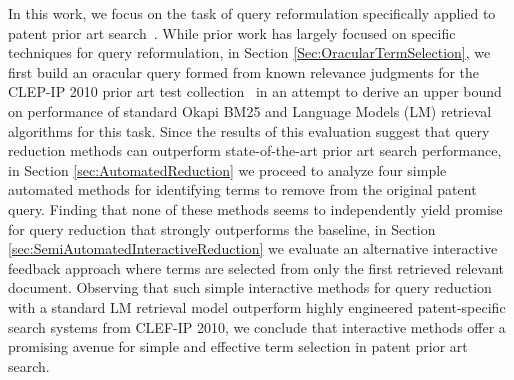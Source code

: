 %
%
In this work, we focus on the task of query
reformulation
specifically applied to patent
prior art
search~\cite{mahdabi2014patent,xue2009transforming}.  While
prior work has largely focused on specific techniques for query
reformulation, in Section \ref{Sec:OracularTermSelection}, we first
build an oracular query formed from known relevance judgments for the
CLEP-IP 2010 prior art test collection~\cite{piroi2010clef} in an attempt
to derive an upper bound on performance of standard Okapi BM25 and
Language Models (LM) retrieval algorithms for this task.  Since the
results of this evaluation suggest that query reduction methods can
outperform state-of-the-art prior art search performance, in Section
\ref{sec:AutomatedReduction} we proceed to analyze four simple
automated methods for identifying terms to remove from the original
patent query.  Finding that none of these methods seems to
independently yield promise for query reduction that strongly
outperforms the baseline, in Section
\ref{sec:SemiAutomatedInteractiveReduction} we evaluate an alternative
interactive feedback approach where terms are selected from only the
first retrieved relevant document.  Observing that such simple
interactive methods for query reduction with a standard LM retrieval
model outperform highly engineered patent-specific search systems from
CLEF-IP 2010, we conclude that interactive methods offer a promising
avenue for simple and effective term selection in patent prior
art search.




